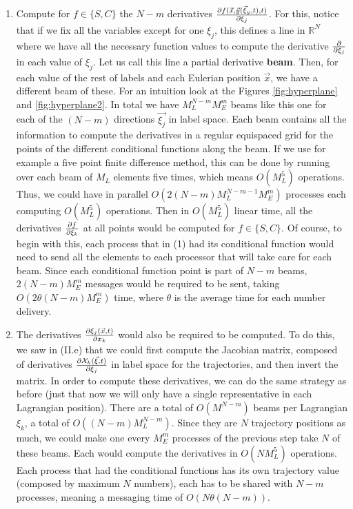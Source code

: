 \documentclass[11pt, a4paper]{article} %
\newcommand{\R}{\mathbb{R}} %
\newcommand{\x}{\mathcal{X}}
\begin{document}
\begin{enumerate}
\begin{enumerate}
\item Compute for $f\in\{S,C\}$ the $N-m$ derivatives $\pdv{f(\vec{x},\vec{y}(\vec{\xi}_y,t),t)}{\xi_j}$. For this, notice that if we fix all the variables except for one $\xi_j$, this defines a line in $\R^N$ where we have all the necessary function values to compute the derivative $\pdv{}{\xi_j}$ in each value of $\xi_j$. Let us call this line a partial derivative {\bf beam}. Then, for each value of the rest of labels and each Eulerian position $\vec{x}$, we have a different beam of these. For an intuition look at the Figures \ref{fig:hyperplane} and \ref{fig:hyperplane2}. In total we have $M_L^{N-m}M_E^m$ beams like this one for each of the $(N-m)$ directions $\vec{\xi_j}$ in label space. Each beam contains all the information to compute the derivatives in a regular equispaced grid for the points of the different conditional functions along the beam. If we use for example a five point finite difference method, this can be done by running over each beam of $M_L$ elements five times, which means $O(M_L^5)$ operations. Thus, we could have in parallel $O(2(N-m)M_L^{N-m-1}M_E^m)$ processes each computing $O(M_L^5)$ operations. Then in $O(M_L^5)$ linear time, all the derivatives $\pdv{f}{\xi_k}$ at all points would be computed for $f\in\{S,C\}$. Of course, to begin with this, each process that in (1) had its conditional function would need to send all the elements to each processor that will take care for each beam. Since each conditional function point is part of $N-m$ beams, $2(N-m)M_E^m$ messages would be required to be sent, taking $O(2\theta (N-m)M_E^m)$ time, where $\theta$ is the average time for each number delivery.\\

\item The derivatives $\pdv{\xi_j(\vec{x},t)}{x_k}$ would also be required to be computed. To do this, we saw in (II.e) that we could first compute the Jacobian matrix, composed of derivatives $\pdv{\x_k(\vec{\xi},t)}{\xi_j}$ in label space for the trajectories, and then invert the matrix. In order to compute these derivatives, we can do the same strategy as before (just that now we will only have a single representative in each Lagrangian position). There are a total of $O(M^{N-m})$ beams per Lagrangian $\xi_k$, a total of $O((N-m)M_L^{N-m})$. Since they are $N$ trajectory positions as much, we could make one every $M_E^m$ processes of the previous step take $N$ of these beams. Each would compute the derivatives in $O(NM_L^5)$ operations. Each process that had the conditional functions has its own trajectory value (composed by maximum $N$ numbers), each has to be shared with $N-m$ processes, meaning a messaging time of $O(N\theta (N-m))$.\\


\end{enumerate}
\end{enumerate}
\end{document}

